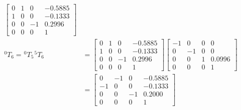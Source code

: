 \begin{equation*}
\begin{split}
\begin{bmatrix}
                                                                         0 & 1 & 0  & -0.5885 \\
                                                                         1 & 0 & 0  & -0.1333 \\
                                                                         0 & 0 & -1 & 0.2996  \\
                                                                         0 & 0 & 0  & 1
                                                                     \end{bmatrix}                                             \\
        ^{0}T_{6} = \hspace{1pt} ^{0}T_{5} \hspace{1pt} ^{5}T_{6} & =\begin{bmatrix}
                                                                         0 & 1 & 0  & -0.5885 \\
                                                                         1 & 0 & 0  & -0.1333 \\
                                                                         0 & 0 & -1 & 0.2996  \\
                                                                         0 & 0 & 0  & 1
                                                                     \end{bmatrix}  \begin{bmatrix}
                                                                                        -1 & 0  & 0 & 0      \\
                                                                                        0  & -1 & 0 & 0      \\
                                                                                        0  & 0  & 1 & 0.0996 \\
                                                                                        0  & 0  & 0 & 1
                                                                                    \end{bmatrix}                              \\
                                                                  & =\begin{bmatrix}
                                                                         0  & -1 & 0  & -0.5885 \\
                                                                         -1 & 0  & 0  & -0.1333 \\
                                                                         0  & 0  & -1 & 0.2000  \\
                                                                         0  & 0  & 0  & 1
                                                                     \end{bmatrix}
    \end{split}
\end{equation*}

